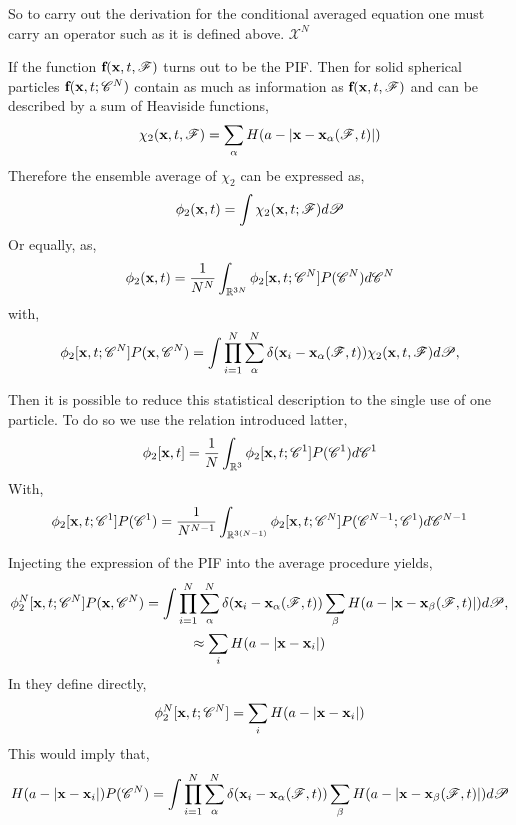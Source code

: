 So to carry out the derivation for the conditional averaged equation one must carry an operator such as it is defined above. 
$\mathscr{X}^N$

If the function $\textbf{f}(\textbf{x},t,\mathscr{F})$ turns out to be the PIF. 
Then for solid spherical particles $\textbf{f}(\textbf{x},t;\mathscr{C}^N)$ contain as much as information as $\textbf{f}(\textbf{x},t,\mathscr{F})$ and can be described by a sum of Heaviside functions, 
\begin{equation}
    \chi_2(\textbf{x},t,\mathscr{F})
    = \sum_\alpha
    H(a - |\textbf{x} -\textbf{x}_\alpha(\mathscr{F},t)|)
\end{equation}
Therefore the ensemble average of $\chi_2$ can be expressed as, 
\begin{equation}
    \phi_2(\textbf{x},t)
    = \int \chi_2(\textbf{x},t;\mathscr{F}) d\mathscr{P}
\end{equation}
Or equally, as, 
\begin{equation}
    \phi_2(\textbf{x},t)
    =\frac{1}{N^N} \int_{\mathbb{R}^{3N}} \phi_2[\textbf{x},t;\mathscr{C}^N] P(\mathscr{C}^N) d\mathscr{C}^N
\end{equation}
with, 
\begin{equation*}
    \phi_2[\textbf{x},t;\mathscr{C}^N] P(\textbf{x},\mathscr{C}^N)
    = 
    \int 
    \prod_{i=1}^{N}\sum_{\alpha}^{N}\delta(\textbf{x}_i - \textbf{x}_\alpha(\mathscr{F},t)) 
    \chi_2(\textbf{x},t,\mathscr{F})
    d\mathscr{P},
\end{equation*}

Then it is possible to reduce this statistical description to the single use of one particle. 
To do so we use the relation introduced latter, 
\begin{equation}
    \phi_2[\textbf{x},t]
    =\frac{1}{N} 
    \int_{\mathbb{R}^3} 
    \phi_2[\textbf{x},t;\mathscr{C}^1]
    P(\mathscr{C}^1)
    d\mathscr{C}^1
\end{equation}
With, 
\begin{equation}
    \phi_2[\textbf{x},t;\mathscr{C}^1]P(\mathscr{C}^1)
    =     
    \frac{1}{N^{N-1}}
    \int_{\mathbb{R}^{3(N-1)}} 
    \phi_2[\textbf{x},t;\mathscr{C}^N] P(\mathscr{C}^{N-1}; \mathscr{C}^1) 
    d\mathscr{C}^{N-1}
\end{equation}

Injecting the expression of the PIF into the average procedure yields, 
\begin{multline*}
    \phi_2^N[\textbf{x},t;\mathscr{C}^N] P(\textbf{x},\mathscr{C}^N)
    = 
    \int 
    \prod_{i=1}^{N}
    \sum_{\alpha}^{N}\delta(\textbf{x}_i - \textbf{x}_\alpha(\mathscr{F},t)) 
    \sum_\beta
    H(a - |\textbf{x} -\textbf{x}_\beta(\mathscr{F},t)|)
    d\mathscr{P},\\
    \approx 
    \sum_i
    H(a - |\textbf{x} -\textbf{x}_i|)
\end{multline*}
In \citet{lundgren1972slow} they define directly, 
\begin{equation}
    \phi_2^N[\textbf{x},t;\mathscr{C}^N]
    = \sum_i 
    H(a-|\textbf{x} - \textbf{x}_i|)
\end{equation}
This would imply that, 
\begin{equation*}
    H(a-|\textbf{x} - \textbf{x}_i|) P(\mathscr{C}^N)
    = \int 
\prod_{i=1}^{N}
\sum_{\alpha}^{N}\delta(\textbf{x}_i - \textbf{x}_\alpha(\mathscr{F},t)) 
\sum_\beta
H(a - |\textbf{x} -\textbf{x}_\beta(\mathscr{F},t)|)
d\mathscr{P}
\end{equation*}

